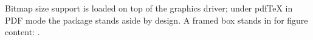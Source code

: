 \documentclass{article}
\begin{document}
Bitmap size support is loaded on top of the graphics driver;
under pdfTeX in PDF mode the package stands aside by design.
A framed box stands in for figure content: .
\end{document}
